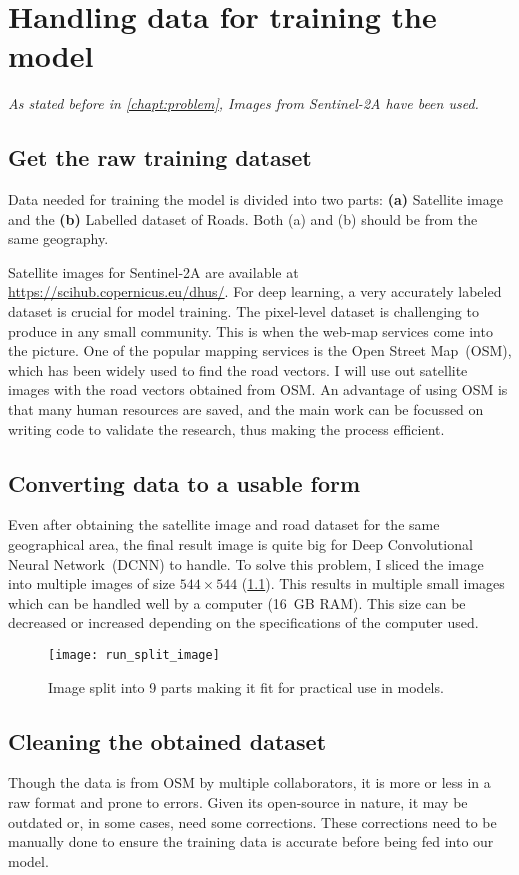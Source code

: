 \chapter{Handling data for training the model}\label{chapt:data}
\textit{As stated before in \cref{chapt:problem}, Images from Sentinel-2A have been used.}

\section{Get the raw training dataset}
Data needed for training the model is divided into two parts: \textbf{(a)} Satellite image and the \textbf{(b)} Labelled dataset of Roads. Both (a) and (b) should be from the same geography.

Satellite images for Sentinel-2A are available at \url{https://scihub.copernicus.eu/dhus/}. For deep learning, a very accurately labeled dataset is crucial for model training. The pixel-level dataset is challenging to produce in any small community. This is when the web-map services come into the picture. One of the popular mapping services is the Open Street Map~(OSM), which has been widely used to find the road vectors. I will use out satellite images with the road vectors obtained from OSM. An advantage of using OSM is that many human resources are saved, and the main work can be focussed on writing code to validate the research, thus making the process efficient.


\section{Converting data to a usable form}
Even after obtaining the satellite image and road dataset for the same geographical area, the final result image is quite big for Deep Convolutional Neural Network~(DCNN) to handle. To solve this problem, I sliced the image into multiple images of size $544\times544$ (\cref{fig:run_split_images}). This results in multiple small images which can be handled well by a computer (16~GB RAM). This size can be decreased or increased depending on the specifications of the computer used.
\begin{figure}[h!]
  \centering
  \texttt{[image: run\_split\_image]}
  \caption{Image split into 9 parts making it fit for practical use in models.}
  \label{fig:run_split_images}
\end{figure}


\section{Cleaning the obtained dataset}
Though the data is from OSM by multiple collaborators, it is more or less in a raw format and prone to errors. Given its open-source in nature, it may be outdated or, in some cases, need some corrections. These corrections need to be manually done to ensure the training data is accurate before being fed into our model.

